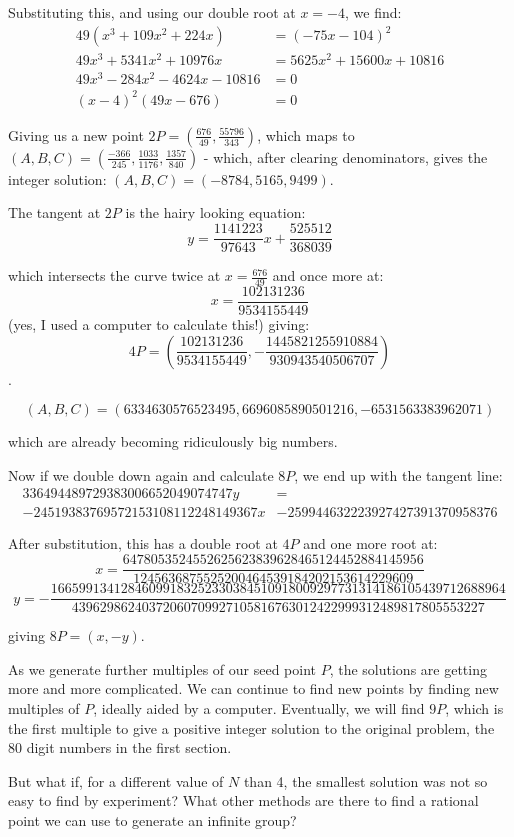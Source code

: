 \documentclass{article}
\begin{document}
Substituting this, and using our double root at $x=-4$, we find:
\begin{equation*}
        \begin{split}
		49(x^3 + 109x^2 + 224x) &= (-75x -104)^2 \\
                 49x^3 + 5341 x^2 + 10976 x &= 5625x^2 + 15600x + 10816 \\
                 49x^3 - 284 x^2 - 4624 x - 10816 &= 0 \\
                 (x - 4)^2 (49x - 676) &= 0
        \end{split}
\end{equation*}

Giving us a new point $2P = (\frac{676}{49},\frac{55796}{343})$, which maps to $(A,B,C) = 
(\frac{-366}{245}, \frac{1033}{1176}, \frac{1357}{840})$ - which, after clearing denominators, gives the integer
solution: $(A,B,C) = (-8784, 5165, 9499)$.

The tangent at $2P$ is the hairy looking equation:
\[ y = \frac{1141223}{97643}x + \frac{525512}{368039} \]

which intersects the curve twice at $x=\frac{676}{49}$ and once more at:
\[ x = \frac{102131236}{9534155449} \] 
(yes, I used a computer to calculate this!) giving:
\[ 4P = (\frac{102131236}{9534155449}, -\frac{1445821255910884}{930943540506707})\].

\[ (A,B,C) = (6334630576523495, 6696085890501216, -6531563383962071) \]

which are already becoming ridiculously big numbers.

Now if we double down again and calculate $8P$, we end up with the tangent line:
\begin{equation*}
	\begin{split}
		336494489729383006652049074747 y &= \\
		 -24519383769572153108112248149367 x &- 259944632223927427391370958376 
	\end{split}
\end{equation*}

After substitution, this has a double root at $4P$ and one more root at:
\[ x = \frac{6478053524552625623839628465124452884145956}{1245636875525200464539184202153614229609} \] 
\[ y = - \frac{16659913412846099183252330384510918009297731314186105439712688964}{43962986240372060709927105816763012422999312489817805553227} \]

giving $8P = (x,-y)$.

As we generate further multiples of our seed point $P$, the solutions are getting more and more complicated.
We can continue to find new points by finding new multiples of $P$, ideally aided by a computer. Eventually,
we will find $9P$, which is the first multiple to give a positive integer solution to the original problem,
the 80 digit numbers in the first section.

But what if, for a different value of $N$ than 4, the smallest solution was not so easy to find by
experiment? What other methods are there to find a rational point we can use to generate an infinite group?
\end{document}
